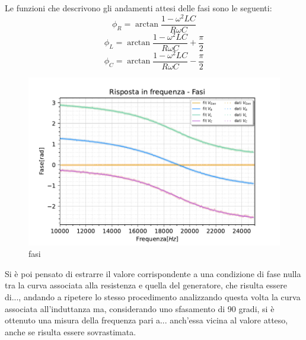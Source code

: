 Le funzioni che descrivono gli andamenti attesi delle fasi sono le seguenti:
 \[
     \phi_R = \arctan{\frac{1 - \omega^2 L C}{R \omega C}}
 \]
\[
    \phi_L = \arctan{\frac{1 - \omega^2 L C}{R \omega C}} + \frac{\pi}{2}
\]
 \[
     \phi_C = \arctan{\frac{1 - \omega^2 L C}{R \omega C}} - \frac{\pi}{2}
 \]

\begin{figure}[h]
    \centering
    \includegraphics[width=.9\textwidth]{../figs/Risposta-in-frequenza-fasi.pdf}
    \caption{fasi }\label{fig:fasi}
\end{figure}

Si è poi pensato di estrarre il valore corrispondente a una condizione di fase nulla tra la curva associata alla resistenza e quella del generatore, che risulta essere di..., andando a ripetere lo stesso procedimento analizzando questa volta la curva associata all’induttanza ma, considerando uno sfasamento di 90 gradi, si è ottenuto una misura della frequenza pari a... anch’essa vicina al valore atteso, anche se risulta essere sovrastimata.

